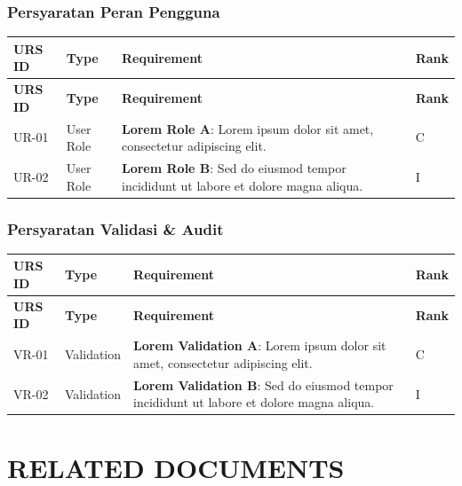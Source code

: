 \documentclass[12pt,a4paper]{article}
\begin{document}
\subsubsection{Persyaratan Peran Pengguna}

\begin{longtable}{|p{2.5cm}|p{2.5cm}|p{7cm}|p{1.5cm}|}
\hline
\textbf{URS ID} & \textbf{Type} & \textbf{Requirement} & \textbf{Rank} \\
\hline
\endfirsthead
\hline
\textbf{URS ID} & \textbf{Type} & \textbf{Requirement} & \textbf{Rank} \\
\hline
\endhead
\hline
\endfoot

UR-01 & User Role & \textbf{Lorem Role A}: Lorem ipsum dolor sit amet, consectetur adipiscing elit. & C \\
\hline

UR-02 & User Role & \textbf{Lorem Role B}: Sed do eiusmod tempor incididunt ut labore et dolore magna aliqua. & I \\
\hline

\end{longtable}

\subsubsection{Persyaratan Validasi \& Audit}

\begin{longtable}{|p{2.5cm}|p{2.5cm}|p{7cm}|p{1.5cm}|}
\hline
\textbf{URS ID} & \textbf{Type} & \textbf{Requirement} & \textbf{Rank} \\
\hline
\endfirsthead
\hline
\textbf{URS ID} & \textbf{Type} & \textbf{Requirement} & \textbf{Rank} \\
\hline
\endhead
\hline
\endfoot

VR-01 & Validation & \textbf{Lorem Validation A}: Lorem ipsum dolor sit amet, consectetur adipiscing elit. & C \\
\hline

VR-02 & Validation & \textbf{Lorem Validation B}: Sed do eiusmod tempor incididunt ut labore et dolore magna aliqua. & I \\
\hline

\end{longtable}

\newpage

\section{RELATED DOCUMENTS}
\end{document}
